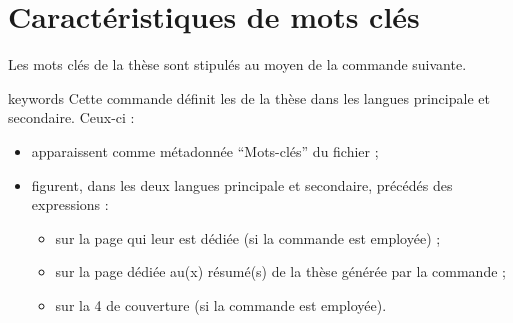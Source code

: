 \section{Caractéristiques de mots clés}
\label{sec-proprietes-de-mots}

Les mots clés de la thèse sont stipulés au moyen de la commande
 suivante.
%
\begin{docCommand}[doc description=\mandatory]{keywords}{}
  Cette commande définit les  de la thèse dans
  les langues principale et secondaire. Ceux-ci :
  \begin{itemize}
  \item apparaissent comme métadonnée \enquote{Mots-clés} du fichier \pdf{} ;
  \item figurent, dans les deux langues principale et secondaire, précédés des
    expressions  :
    \begin{itemize}
    \item sur la page qui leur est dédiée (si la commande 
      est employée) ;
    \item sur la page dédiée au(x) résumé(s) de la thèse générée par la
      commande  ;
    \item sur la 4\ieme{} de couverture (si la commande 
      est employée).
    \end{itemize}
  \end{itemize}
\end{docCommand}

